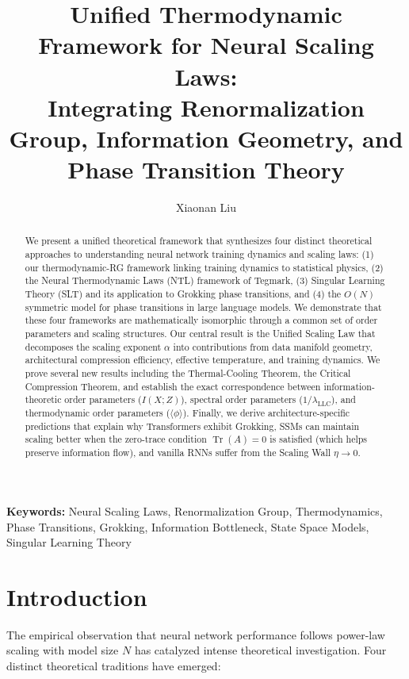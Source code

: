 \documentclass[11pt, a4paper]{article}
\title{\textbf{Unified Thermodynamic Framework for Neural Scaling Laws: \\ Integrating Renormalization Group, Information Geometry, and Phase Transition Theory}}
\author[1]{Xiaonan Liu}
\affil[1]{Arizona State University \\ \texttt{xliu203@asu.edu}}
\date{\vspace{-5ex}} %
\theoremstyle{plain}
\DeclareMathOperator{\Tr}{Tr}
\begin{document}
\maketitle

\begin{abstract}
We present a unified theoretical framework that synthesizes four distinct theoretical approaches to understanding neural network training dynamics and scaling laws: (1) our thermodynamic-RG framework linking training dynamics to statistical physics, (2) the Neural Thermodynamic Laws (NTL) framework of Tegmark, (3) Singular Learning Theory (SLT) and its application to Grokking phase transitions, and (4) the $O(N)$ symmetric model for phase transitions in large language models. We demonstrate that these four frameworks are mathematically isomorphic through a common set of order parameters and scaling structures. Our central result is the Unified Scaling Law that decomposes the scaling exponent $\alpha$ into contributions from data manifold geometry, architectural compression efficiency, effective temperature, and training dynamics. We prove several new results including the Thermal-Cooling Theorem, the Critical Compression Theorem, and establish the exact correspondence between information-theoretic order parameters ($I(X;Z)$), spectral order parameters ($1/\lambda_{\text{LLC}}$), and thermodynamic order parameters ($\langle \phi \rangle$). Finally, we derive architecture-specific predictions that explain why Transformers exhibit Grokking, SSMs can maintain scaling better when the zero-trace condition $\Tr(A) = 0$ is satisfied (which helps preserve information flow), and vanilla RNNs suffer from the Scaling Wall $\eta \to 0$.
\end{abstract}

\vspace{1em}
\noindent\textbf{Keywords:} Neural Scaling Laws, Renormalization Group, Thermodynamics, Phase Transitions, Grokking, Information Bottleneck, State Space Models, Singular Learning Theory

\section{Introduction}

The empirical observation that neural network performance follows power-law scaling with model size $N$ \citep{kaplan2020scaling,hoffmann2022training} has catalyzed intense theoretical investigation. Four distinct theoretical traditions have emerged:
\end{document}
